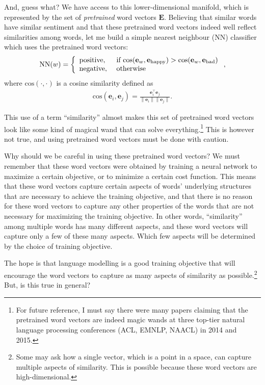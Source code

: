 \documentclass{report}
\newcommand{\vect}[1]{\mathbf{#1}}
\newcommand{\matr}[1]{\mathbf{#1}}
\newcommand{\ve}[0]{\vect{e}}
\newcommand{\mE}[0]{\matr{E}}
\begin{document}
And, guess what? We have access to this lower-dimensional manifold, which is
represented by the set of {\em pretrained} word vectors $\mE$. Believing that
similar words have similar sentiment and that these pretrained word vectors
indeed well reflect similarities among words, let me build a simple nearest
neighbour (NN) classifier which uses the pretrained word vectors:
\begin{align*}
    \text{NN}(w) = \left\{ \begin{array}{l l}
            \text{positive},&\text{ if } \text{cos}(\ve_w,\ve_{\text{happy}}) > 
            \text{cos}(\ve_w,\ve_{\text{bad}}) \\
            \text{negative},&\text{ otherwise}
        \end{array}
    \right.,
\end{align*}
where $\text{cos}(\cdot, \cdot)$ is a cosine similarity defined as
\begin{align*}
    \text{cos}(\ve_i, \ve_j) = \frac{\ve_i^\top \ve_j}{\|\ve_i\| \|\ve_j\|}.
\end{align*}

This use of a term ``similarity'' almost makes this set of pretrained word
vectors look like some kind of magical wand that can solve everything.\footnote{
    For future reference, I must say there were many papers claiming that the
    pretrained word vectors are indeed magic wands at three top-tier natural
    language processing conferences (ACL, EMNLP, NAACL) in 2014 and 2015.
} This is however not true, and using pretrained word vectors must be done with
caution. 

Why should we be careful in using these pretrained word vectors? We must
remember that these word vectors were obtained by training a neural network to
maximize a certain objective, or to minimize a certain cost function. This means
that these word vectors capture certain aspects of words' underlying structures
that are necessary to achieve the training objective, and that there is no
reason for these word vectors to capture any other properties of the words that
are not necessary for maximizing the training objective.  In other words,
``similarity'' among multiple words has many different aspects, and these word
vectors will capture only a few of these many aspects. Which few aspects will be
determined by the choice of training objective.

The hope is that language modelling is a good training objective that will
encourage the word vectors to capture as many aspects of similarity as
possible.\footnote{
    Some may ask how a single vector, which is a point in a space, can capture
    multiple aspects of similarity. This is possible because these word vectors
    are high-dimensional.
} But, is this true in general? 
\end{document}

